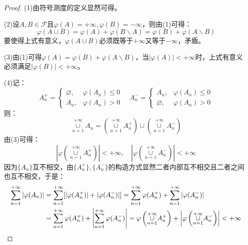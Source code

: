 \begin{proof}
	(1)由符号测度的定义显然可得。\par
	(2)设$A,B\in\mathscr{F}$且$\varphi(A)=+\infty,\varphi(B)=-\infty$，则由(1)可得：
	\begin{equation*}
		\varphi(A\cup B)=\varphi(A)+\varphi(B\backslash A)=\varphi(B)+\varphi(A\backslash B)
	\end{equation*}
	要使得上式有意义，$\varphi(A\cup B)$必须既等于$+\infty$又等于$-\infty$，矛盾。\par
	(3)由(1)可得$\varphi(A)=\varphi(B)+\varphi(A\backslash B)$，当$|\varphi(A)|<+\infty$时，上式有意义必须满足$|\varphi(B)|<+\infty$。\par
	(4)记：
	\begin{equation*}
		A_n^+=
		\begin{cases}
			\varnothing,&\varphi(A_n)\leqslant0 \\
			A_n,&\varphi(A_n)>0
		\end{cases}
		\quad
		A_n^-=
		\begin{cases}
			A_n,&\varphi(A_n)\leqslant0 \\
			\varnothing,&\varphi(A_n)>0
		\end{cases}
	\end{equation*}
	则：
	\begin{equation*}
		\underset{n=1}{\overset{+\infty}{\cup}}A_n=\left(\underset{n=1}{\overset{+\infty}{\cup}}A_n^+\right)\cup\left(\underset{n=1}{\overset{+\infty}{\cup}}A_n^-\right)
	\end{equation*}
	由(3)可得：
	\begin{equation*}
		\left|\varphi\left(\underset{n=1}{\overset{+\infty}{\cup}}A_n^+\right)\right|<+\infty,\quad
		\left|\varphi\left(\underset{n=1}{\overset{+\infty}{\cup}}A_n^-\right)\right|<+\infty
	\end{equation*}
	因为$\{A_n\}$互不相交，由$\{A_n^+\},\{A_n^-\}$的构造方式显然二者内部互不相交且二者之间也互不相交，于是：
	\begin{align*}
		\sum_{n=1}^{+\infty}|\varphi(A_n)|&=\sum_{n=1}^{+\infty}[|\varphi(A_n^+)|+|\varphi(A_n^-)|] =\sum_{n=1}^{+\infty}\varphi(A_n^+)+\sum_{n=1}^{+\infty}|\varphi(A_n^-)| \\
		&=\sum_{n=1}^{+\infty}\varphi(A_n^+)+\left|\sum_{n=1}^{+\infty}\varphi(A_n^-)\right|
		=\varphi\left(\underset{n=1}{\overset{+\infty}{\cup}}A_n^+\right)+\left|\varphi\left(\underset{n=1}{\overset{+\infty}{\cup}}A_n^-\right)\right|<+\infty\qedhere
	\end{align*}
\end{proof}
